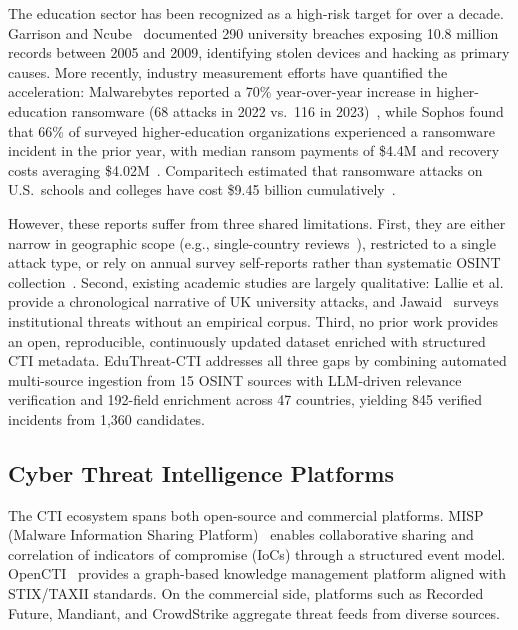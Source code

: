 \documentclass[sigconf,anonymous]{acmart}
\newcommand{\sys}{EduThreat-CTI\xspace}
\newcommand{\rawcollected}{1{,}360\xspace}       %
\newcommand{\numincidents}{845\xspace}            %
\newcommand{\numcountries}{47\xspace}
\newcommand{\numsources}{15\xspace}
\begin{document}
The education sector has been recognized as a high-risk target for over a decade. Garrison and Ncube~\cite{garrison2011longitudinal} documented 290 university breaches exposing 10.8 million records between 2005 and 2009, identifying stolen devices and hacking as primary causes. More recently, industry measurement efforts have quantified the acceleration: Malwarebytes reported a 70\% year-over-year increase in higher-education ransomware (68 attacks in 2022 vs.\ 116 in 2023)~\cite{malwarebytes2024education}, while Sophos found that 66\% of surveyed higher-education organizations experienced a ransomware incident in the prior year, with median ransom payments of \$4.4M and recovery costs averaging \$4.02M~\cite{sophos2024education}. Comparitech estimated that ransomware attacks on U.S.\ schools and colleges have cost \$9.45 billion cumulatively~\cite{comparitech2024schools}.

However, these reports suffer from three shared limitations. First, they are either narrow in geographic scope (e.g., single-country reviews~\cite{lallie2025ukuniversities}), restricted to a single attack type, or rely on annual survey self-reports rather than systematic OSINT collection~\cite{sophos2024education,malwarebytes2024education}. Second, existing academic studies are largely qualitative: Lallie et al.~\cite{lallie2025ukuniversities} provide a chronological narrative of UK university attacks, and Jawaid~\cite{jawaid2022eduthreats} surveys institutional threats without an empirical corpus. Third, no prior work provides an open, reproducible, continuously updated dataset enriched with structured CTI metadata. \sys addresses all three gaps by combining automated multi-source ingestion from \numsources OSINT sources with LLM-driven relevance verification and 192-field enrichment across \numcountries countries, yielding \numincidents verified incidents from \rawcollected candidates.

\subsection{Cyber Threat Intelligence Platforms}\label{sec:related:cti}

The CTI ecosystem spans both open-source and commercial platforms. MISP (Malware Information Sharing Platform)~\cite{wagner2016misp} enables collaborative sharing and correlation of indicators of compromise (IoCs) through a structured event model. OpenCTI~\cite{opencti} provides a graph-based knowledge management platform aligned with STIX/TAXII standards. On the commercial side, platforms such as Recorded Future, Mandiant, and CrowdStrike aggregate threat feeds from diverse sources.
\end{document}
